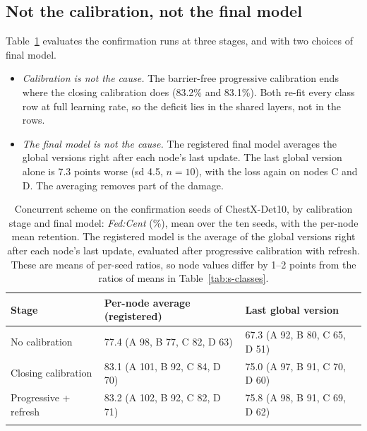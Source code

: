 \documentclass[pdflatex,sn-mathphys-num]{sn-jnl}
\newcommand{\fedcent}{\textit{Fed:Cent}}
\begin{document}
\subsection{Not the calibration, not the final model}

Table~\ref{tab:s-stages} evaluates the confirmation runs at three stages, and with two choices of final model.
\begin{itemize}
\item \emph{Calibration is not the cause.} The barrier-free progressive calibration ends where the closing calibration does (83.2\% and 83.1\%). Both re-fit every class row at full learning rate, so the deficit lies in the shared layers, not in the rows.
\item \emph{The final model is not the cause.} The registered final model averages the global versions right after each node's last update. The last global version alone is 7.3 points worse (sd 4.5, $n=10$), with the loss again on nodes C and D. The averaging removes part of the damage.
\end{itemize}

\begin{table}[h]
\caption{Concurrent scheme on the confirmation seeds of ChestX-Det10, by calibration stage and final model: \fedcent{} (\%), mean over the ten seeds, with the per-node mean retention. The registered model is the average of the global versions right after each node's last update, evaluated after progressive calibration with refresh. These are means of per-seed ratios, so node values differ by 1--2 points from the ratios of means in Table~\ref{tab:s-classes}.}\label{tab:s-stages}
\footnotesize
\setlength{\tabcolsep}{3pt}
\begin{tabular*}{\textwidth}{@{\extracolsep\fill}lll}
\toprule
Stage & Per-node average (registered) & Last global version \\
\midrule
No calibration & 77.4 (A 98, B 77, C 82, D 63) & 67.3 (A 92, B 80, C 65, D 51) \\
Closing calibration & 83.1 (A 101, B 92, C 84, D 70) & 75.0 (A 97, B 91, C 70, D 60) \\
Progressive + refresh & 83.2 (A 102, B 92, C 82, D 71) & 75.8 (A 98, B 91, C 69, D 62) \\
\botrule
\end{tabular*}
\end{table}
\end{document}
